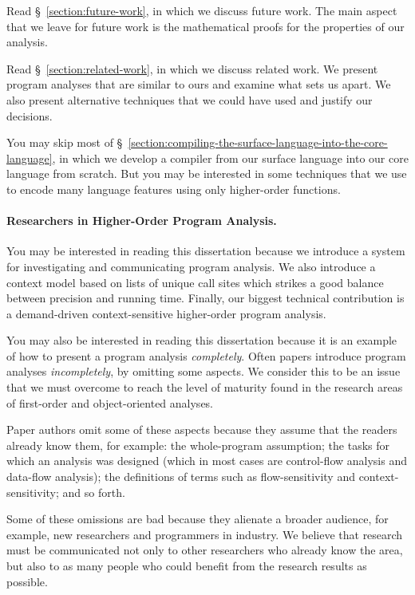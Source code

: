 \documentclass[12pt, oneside]{book}
\begin{document}
Read §~\ref{section:future-work}, in which we discuss future work. The main aspect that we leave for future work is the mathematical proofs for the properties of our analysis.

Read §~\ref{section:related-work}, in which we discuss related work. We present program analyses that are similar to ours and examine what sets us apart. We also present alternative techniques that we could have used and justify our decisions.

You may skip most of §~\ref{section:compiling-the-surface-language-into-the-core-language}, in which we develop a compiler from our surface language into our core language from scratch. But you may be interested in some techniques that we use to encode many language features using only higher-order functions.

\paragraph{Researchers in Higher-Order Program Analysis.}

You may be interested in reading this dissertation because we introduce a system for investigating and communicating program analysis. We also introduce a context model based on lists of unique call sites which strikes a good balance between precision and running time. Finally, our biggest technical contribution is a demand-driven context-sensitive higher-order program analysis.

You may also be interested in reading this dissertation because it is an example of how to present a program analysis \emph{completely}. Often papers introduce program analyses \emph{incompletely}, by omitting some aspects. We consider this to be an issue that we must overcome to reach the level of maturity found in the research areas of first-order and object-oriented analyses.

Paper authors omit some of these aspects because they assume that the readers already know them, for example: the whole-program assumption; the tasks for which an analysis was designed (which in most cases are control-flow analysis and data-flow analysis); the definitions of terms such as flow-sensitivity and context-sensitivity; and so forth.

Some of these omissions are bad because they alienate a broader audience, for example, new researchers and programmers in industry. We believe that research must be communicated not only to other researchers who already know the area, but also to as many people who could benefit from the research results as possible.
\end{document}
